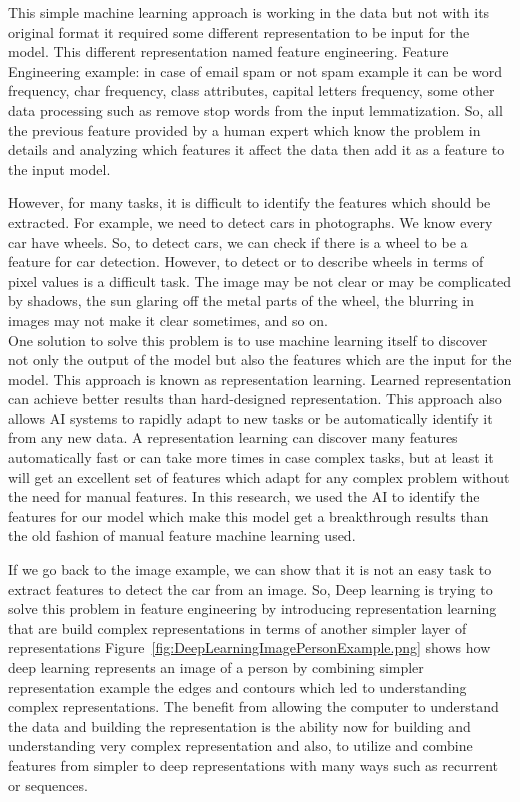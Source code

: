       This simple machine learning approach is working in the data but not with its original format it required some different representation to be input for the model. This different representation named feature engineering. Feature Engineering example: in case of email spam or not spam example it can be word frequency, char frequency, class attributes, capital letters frequency, some other data processing such as remove stop words from the input lemmatization. So, all the previous feature provided by a human expert which know the problem in details and analyzing which features it affect the data then add it as a feature to the input model.
      

      However, for many tasks, it is difficult to identify the features which should be extracted. For example, we need to detect cars in photographs. We know every car have wheels. So, to detect cars, we can check if there is a wheel to be a feature for car detection. However, to detect or to describe wheels in terms of pixel values is a difficult task. The image may be not clear or may be complicated by shadows, the sun glaring off the metal parts of the wheel, the blurring in images may not make it clear sometimes, and so on\cite{Goodfellow-et-al-2016}.\\

      One solution to solve this problem is to use machine learning itself to discover not only the output of the model but also the features which are the input for the model. This approach is known as representation learning. Learned representation can achieve better results than hard-designed representation. This approach also allows AI systems to rapidly adapt to new tasks or be automatically identify it from any new data. A representation learning can discover many features automatically fast or can take more times in case complex tasks, but at least it will get an excellent set of features which adapt for any complex problem without the need for manual features. In this research, we used the AI to identify the features for our model which make this model get a breakthrough results than the old fashion of manual feature machine learning used.

      If we go back to the image example, we can show that it is not an easy task to extract features to detect the car from an image. So, Deep learning is trying to solve this problem in feature engineering by introducing representation learning that are build complex representations in terms of another simpler layer of representations Figure~\ref{fig:DeepLearningImagePersonExample.png} shows how deep learning represents an image of a person by combining simpler representation example the edges and contours which led to understanding complex representations. The benefit from allowing the computer to understand the data and building the representation is the ability now for building and understanding very complex representation and also, to utilize and combine features from simpler to deep representations with many ways such as recurrent or sequences.

